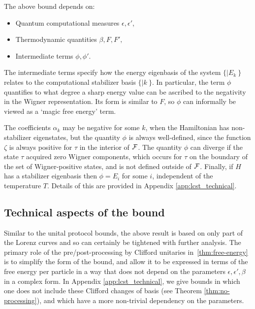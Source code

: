 \documentclass[pra,
aps,
twocolumn,
superscriptaddress,
groupedaddress,
nofootinbib,
reprint
]{revtex4-1}
\begin{document}
The above bound depends on: 
\begin{itemize}
\item Quantum computational measures $\epsilon, \epsilon'$,
\item Thermodynamic quantities $\beta, F, F',$
\item Intermediate terms $\phi, \phi'$. 
\end{itemize}
The intermediate terms specify how the energy eigenbasis of the system $\{|E_k\>\}$ relates to the computational stabilizer basis $\{|k\>\}$.  In particular, the term $\phi$ quantifies to what degree a sharp energy value can be ascribed to the negativity in the Wigner representation. Its form is similar to $F$, so $\phi$ can informally be viewed as a `magic free energy' term. 

The coefficients $\alpha_k$ may be negative for some $k$, when the Hamiltonian has non-stabilizer eigenstates, but the quantity $\phi$ is always well-defined, since the function $\zeta$ is always positive for $\tau$ in the interior of ${\mathcal F}$. The quantity $\phi$ can diverge if the state $\tau$ acquired zero Wigner components, which occurs for $\tau$ on the boundary of the set of Wigner-positive states, and is not defined outside of ${\mathcal F}$. Finally, if $H$ has a stabilizer eigenbasis then $\phi = E_i$ for some $i$, independent of the temperature $T$. Details of this are provided in Appendix \ref{app:lcst_technical}.

\subsection{Technical aspects of the bound}
Similar to the unital protocol bounds, the above result is based on only part of the Lorenz curves and so can certainly be tightened with further analysis. The primary role of the pre/post-processing by Clifford unitaries in~\cref{thm:free-energy} is to simplify the form of the bound, and allow it to be expressed in terms of the free energy per particle in a way that does not depend on the parameters $\epsilon, \epsilon', \beta$ in a complex form. In Appendix \ref{app:lcst_technical}, we give bounds in which one does not include these Clifford changes of basis (see Theorem \ref{thm:no-processing}), and which have a more non-trivial dependency on the parameters.
\end{document}
